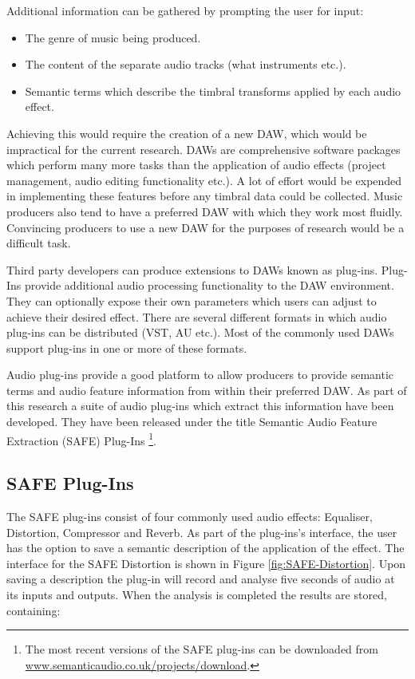 		Additional information can be gathered by prompting the user for input:

		\begin{itemize}
			\item The genre of music being produced.
			\item The content of the separate audio tracks (what instruments etc.).
			\item Semantic terms which describe the timbral transforms applied by each audio
			      effect.
		\end{itemize}

		Achieving this would require the creation of a new DAW, which would be impractical for the current
		research. DAWs are comprehensive software packages which perform many more tasks than the application of
		audio effects (project management, audio editing functionality etc.). A lot of effort would be expended in
		implementing these features before any timbral data could be collected. Music producers also tend to have a
		preferred DAW with which they work most fluidly. Convincing producers to use a new DAW for the purposes of
		research would be a difficult task.

		Third party developers can produce extensions to DAWs known as plug-ins. Plug-Ins provide additional audio
		processing functionality to the DAW environment. They can optionally expose their own parameters which
		users can adjust to achieve their desired effect. There are several different formats in which audio
		plug-ins can be distributed (VST, AU etc.). Most of the commonly used DAWs support plug-ins in one or more
		of these formats.

		Audio plug-ins provide a good platform to allow producers to provide semantic terms and audio feature
		information from within their preferred DAW. As part of this research a suite of audio plug-ins which
		extract this information have been developed. They have been released under the title Semantic Audio
		Feature Extraction (SAFE) Plug-Ins \footnote{The most recent versions of the SAFE plug-ins can be
		downloaded from \href{http://www.semanticaudio.co.uk/projects/download/}
		{www.semanticaudio.co.uk/projects/download}.}.

	\subsection{SAFE Plug-Ins}
	\label{sec:TimbreEvaluation-DAWBasedTimbreEvaluation-SAFE}
		The SAFE plug-ins consist of four commonly used audio effects: Equaliser, Distortion, Compressor and
		Reverb. As part of the plug-ins's interface, the user has the option to save a semantic description of the
		application of the effect. The interface for the SAFE Distortion is shown in Figure
		\ref{fig:SAFE-Distortion}. Upon saving a description the plug-in will record and analyse five seconds of
		audio at its inputs and outputs. When the analysis is completed the results are stored, containing:


